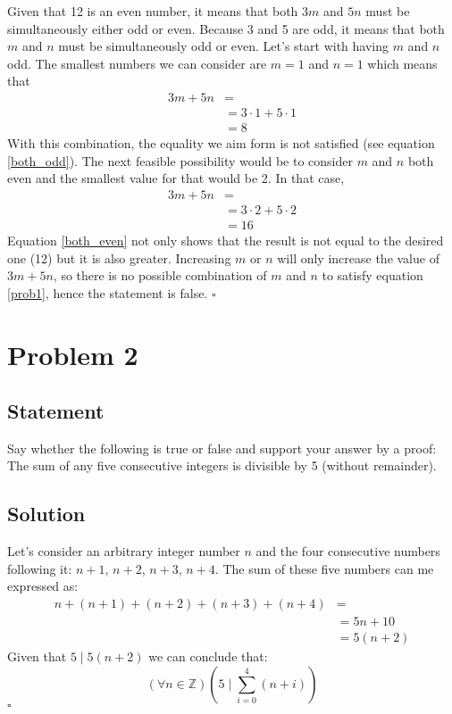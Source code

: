 \documentclass[12pt,letter]{memoir}
\begin{document}
Given that 12 is an even number, it means that both $3m$ and $5n$ must be simultaneously either odd or even. Because 3 and 5 are odd, it means that both $m$ and $n$ must be simultaneously odd or even. Let's start with having $m$ and $n$ odd.
The smallest numbers we can consider are $m=1$ and $n=1$ which means that
\begin{equation}\label{both_odd}
\begin{split}
3m+5n & = \\
 & = 3\cdot1+5\cdot1 \\
 & = 8
\end{split}
\end{equation}
With this combination, the equality we aim form is not satisfied (see equation \ref{both_odd}). The next feasible possibility would be to consider $m$ and $n$ both even and the smallest value for that would be 2. In that case,
\begin{equation}\label{both_even}
\begin{split}
3m+5n & = \\
 & = 3\cdot2+5\cdot2 \\
 & = 16
\end{split}
\end{equation}
Equation \ref{both_even} not only shows that the result is not equal to the desired one (12) but it is also greater. Increasing $m$ or $n$ will only increase the value of $3m+5n$, so there is no possible combination of $m$ and $n$ to satisfy equation \ref{prob1}, hence the statement is false. $\square$
\chapter{Problem 2}
\section*{Statement}
Say whether the following is true or false and support your answer by a proof: The sum of any five consecutive integers is divisible by 5 (without remainder).
\section*{Solution}
Let's consider an arbitrary integer number $n$ and the four consecutive numbers following it: $n+1$, $n+2$, $n+3$, $n+4$. The sum of these five numbers can me expressed as:
\begin{equation}\label{fiveconsecutive}
\begin{split}
n+(n+1)+(n+2)+(n+3)+(n+4) & = \\
 & =  5n+10\\
& = 5(n+2)
\end{split}
\end{equation}
Given that $5\mid5(n+2)$ we can conclude that:
\begin{equation}
(\forall n \in \mathbb{Z})(5 \mid \sum_{i=0}^{4}(n+i))
\end{equation}
$\square$
\end{document}
